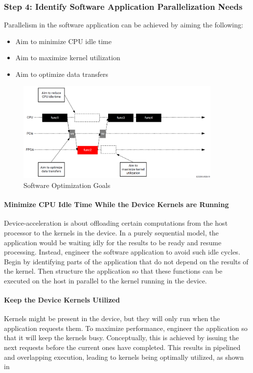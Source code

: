 \subsubsection{Step 4: Identify Software Application Parallelization Needs}
Parallelism in the software application can be achieved by aiming the following:
\begin{itemize}
    \item Aim to minimize CPU idle time
    \item Aim to maximize kernel utilization
    \item Aim to optimize data transfers   
\end{itemize}

\begin{figure}[H]
    \begin{center}
        \includegraphics[width=0.9\textwidth]{images/SoftwareOptimization.PNG}
        \caption{Software Optimization Goals}
        \label{SoftwareOptimization}
    \end{center}
\end{figure}

\paragraph{Minimize CPU Idle Time While the Device Kernels are Running}
Device-acceleration is about offloading certain computations from the host processor to the kernels in the device. In a purely sequential model, the application would be waiting idly for the results to be ready and resume processing. Instead, engineer the software application to avoid such idle cycles. Begin by identifying parts of the application that do not depend on the results of the kernel. Then structure the application so that these functions can be executed on the host in parallel to the kernel running in the device. 

\paragraph{Keep the Device Kernels Utilized}
Kernels might be present in the device, but they will only run when the application requests them. To maximize performance, engineer the application so that it will keep the kernels busy. Conceptually, this is achieved by issuing the  next requests before the current ones have completed. This results in pipelined and overlapping execution, leading to kernels being optimally utilized, as shown in 

